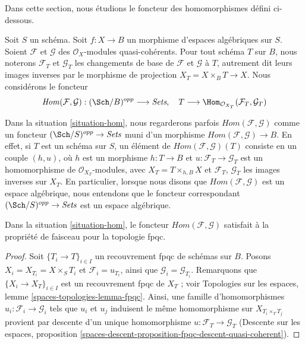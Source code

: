 \noindent
Dans cette section, nous étudions le foncteur des homomorphismes défini
ci-dessous.

\begin{situation}
\label{situation-hom}
Soit $S$ un schéma. Soit $f : X \to B$ un morphisme d'espaces algébriques sur
$S$. Soient $\mathcal{F}$ et $\mathcal{G}$ des $\mathcal{O}_X$-modules
quasi-cohérents. Pour tout schéma $T$ sur $B$, nous noterons $\mathcal{F}_T$
et $\mathcal{G}_T$ les changements de base de $\mathcal{F}$ et
$\mathcal{G}$ à $T$, autrement dit leurs images inverses par le morphisme de
projection $X_T = X \times_B T \to X$. Nous considérons le foncteur
\begin{equation}
\label{equation-hom}
\mathit{Hom}(\mathcal{F}, \mathcal{G}) :
(\Sch/B)^{opp}
\longrightarrow
\textit{Sets},\quad
T
\longrightarrow
\Hom_{\mathcal{O}_{X_T}}(\mathcal{F}_T, \mathcal{G}_T)
\end{equation}
\end{situation}

\noindent
Dans la situation \ref{situation-hom}, nous regarderons parfois
$\mathit{Hom}(\mathcal{F}, \mathcal{G})$ comme un foncteur
$(\Sch/S)^{opp} \to \textit{Sets}$ muni d'un morphisme
$\mathit{Hom}(\mathcal{F}, \mathcal{G}) \to B$. En effet, si $T$ est un
schéma sur $S$, un élément de
$\mathit{Hom}(\mathcal{F}, \mathcal{G})(T)$ consiste en un couple $(h, u)$,
où $h$ est un morphisme $h : T \to B$ et
$u : \mathcal{F}_T \to \mathcal{G}_T$ est un homomorphisme de
$\mathcal{O}_{X_T}$-modules, avec $X_T = T \times_{h, B} X$ et
$\mathcal{F}_T$, $\mathcal{G}_T$ les images inverses sur $X_T$. En
particulier, lorsque nous disons que
$\mathit{Hom}(\mathcal{F}, \mathcal{G})$ est un espace algébrique, nous
entendons que le foncteur correspondant
$(\Sch/S)^{opp} \to \textit{Sets}$ est un espace algébrique.

\begin{lemma}
\label{lemma-hom-sheaf}
Dans la situation \ref{situation-hom}, le foncteur
$\mathit{Hom}(\mathcal{F}, \mathcal{G})$
satisfait à la propriété de faisceau pour la topologie fpqc.
\end{lemma}

\begin{proof}
Soit $\{T_i \to T\}_{i \in I}$ un recouvrement fpqc de schémas sur $B$.
Posons $X_i = X_{T_i} = X \times_S T_i$ et $\mathcal{F}_i = u_{T_i}$,
ainsi que $\mathcal{G}_i = \mathcal{G}_{T_i}$. Remarquons que
$\{X_i \to X_T\}_{i \in I}$ est un recouvrement fpqc de $X_T$ ; voir
Topologies sur les espaces, lemme
\ref{spaces-topologies-lemma-fpqc}. Ainsi, une famille d'homomorphismes
$u_i : \mathcal{F}_i \to \mathcal{G}_i$ tels que $u_i$ et $u_j$
induisent le même homomorphisme sur $X_{T_i \times_T T_j}$ provient par
descente d'un unique homomorphisme
$u : \mathcal{F}_T \to \mathcal{G}_T$
(Descente sur les espaces, proposition
\ref{spaces-descent-proposition-fpqc-descent-quasi-coherent}).
\end{proof}

